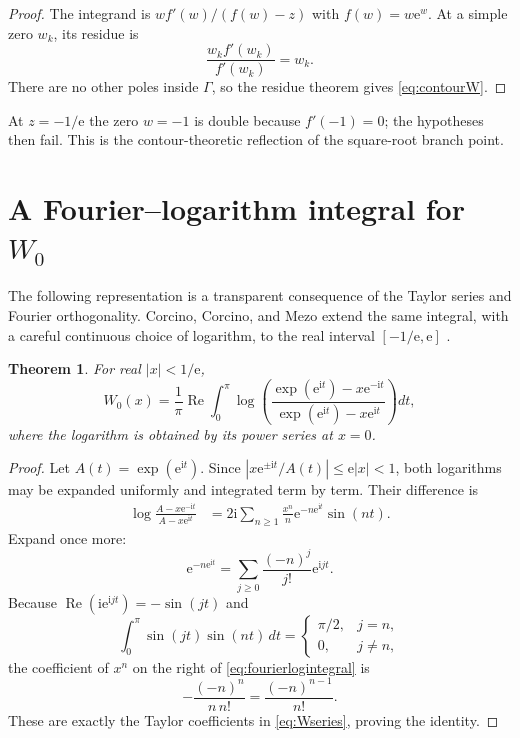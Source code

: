 \documentclass[11pt,oneside]{book}
\newtheorem{theorem}{Theorem}[chapter]
\theoremstyle{definition}
\theoremstyle{remark}
\newcommand{\ee}{\mathrm e}
\newcommand{\ii}{\mathrm i}
\begin{document}
\begin{proof}
The integrand is $w f'(w)/(f(w)-z)$ with $f(w)=w\ee^w$.  At a simple zero
$w_k$, its residue is
\[
 \frac{w_k f'(w_k)}{f'(w_k)}=w_k.
\]
There are no other poles inside $\Gamma$, so the residue theorem gives
\eqref{eq:contourW}.
\end{proof}

At $z=-1/\ee$ the zero $w=-1$ is double because $f'(-1)=0$; the hypotheses
then fail.  This is the contour-theoretic reflection of the square-root branch
point.

\section{A Fourier--logarithm integral for $W_0$}

The following representation is a transparent consequence of the Taylor
series and Fourier orthogonality.  Corcino, Corcino, and Mezo extend the same
integral, with a careful continuous choice of logarithm, to the real interval
$[-1/\ee,\ee]$ \cite{corcino2018}.

\begin{theorem}\label{thm:fourierlogintegral}
For real $|x|<1/\ee$,
\begin{equation}\label{eq:fourierlogintegral}
 W_0(x)=\frac1\pi\operatorname{Re}\int_0^\pi
 \log\!\left(
 \frac{\exp(\ee^{\ii t})-x\ee^{-\ii t}}
      {\exp(\ee^{\ii t})-x\ee^{\ii t}}
 \right)dt,
\end{equation}
where the logarithm is obtained by its power series at $x=0$.
\end{theorem}

\begin{proof}
Let $A(t)=\exp(\ee^{\ii t})$.  Since
$|x\ee^{\pm\ii t}/A(t)|\le \ee|x|<1$, both logarithms may be expanded
uniformly and integrated term by term.  Their difference is
\begin{align*}
 \log\frac{A-x\ee^{-\ii t}}{A-x\ee^{\ii t}}
 &=2\ii\sum_{n\ge1}\frac{x^n}{n}
      \ee^{-n\ee^{\ii t}}\sin(nt).
\end{align*}
Expand once more:
\[
 \ee^{-n\ee^{\ii t}}
 =\sum_{j\ge0}\frac{(-n)^j}{j!}\ee^{\ii jt}.
\]
Because $\operatorname{Re}(\ii\ee^{\ii jt})=-\sin(jt)$ and
\[
 \int_0^\pi\sin(jt)\sin(nt)\,dt=
 \begin{cases}\pi/2,&j=n,\\0,&j\ne n,\end{cases}
\]
the coefficient of $x^n$ on the right of
\eqref{eq:fourierlogintegral} is
\[
 -\frac{(-n)^n}{n\,n!}=\frac{(-n)^{n-1}}{n!}.
\]
These are exactly the Taylor coefficients in
\eqref{eq:Wseries}, proving the identity.
\end{proof}
\end{document}
